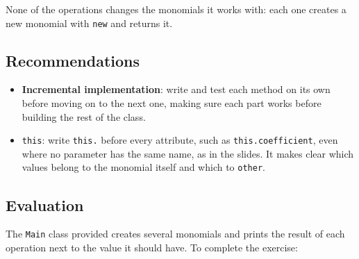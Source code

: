 None of the operations changes the monomials it works with: each one creates a new monomial with \texttt{new} and returns it.

\subsection{Recommendations}

\begin{itemize}

    \item \textbf{Incremental implementation}: write and test each method on its own before moving on to the next one, making sure each part works before building the rest of the class.

    \item \texttt{this}: write \texttt{this.} before every attribute, such as \texttt{this.coefficient}, even where no parameter has the same name, as in the slides. It makes clear which values belong to the monomial itself and which to \texttt{other}.

\end{itemize}

\subsection{Evaluation}

The \texttt{Main} class provided creates several monomials and prints the result of each operation next to the value it should have. To complete the exercise:

